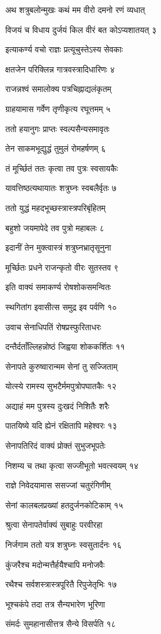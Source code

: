 अथ शत्रुबलोन्मुखः कथं मम वीरो दमनो रणं व्यधात्

विजयं च विधाय दुर्जयं किल वीरं बत कोऽप्यशातयत् ३

इत्याकर्ण्य वचो राज्ञः प्रत्यूचुस्तेऽस्य सेवकाः

क्षतजेन परिक्लिन्न गात्रवस्त्रादिधारिणः ४

राजन्नश्वं समालोक्य पत्रचिह्नाद्यलंकृतम्

ग्राहयामास गर्वेण तृणीकृत्य रघूत्तमम् ५

ततो हयानुगः प्राप्तः स्वल्पसैन्यसमावृतः

तेन साकमभूद्युद्धं तुमुलं रोमहर्षणम् ६

तं मूर्च्छितं ततः कृत्वा तव पुत्रः स्वसायकैः

यावत्तिष्ठत्यथायातः शत्रुघ्नः स्वबलैर्वृतः ७

ततो युद्धं महदभूच्छस्त्रास्त्रपरिबृंहितम्

बहुशो जयमापेदे तव पुत्रो महाबलः ८

इदानीं तेन मुक्त्वास्त्रं शत्रुघ्नभ्रातृसूनुना

मूर्च्छितः प्रधने राजन्कृतो वीरः सुतस्तव ९

इति वाक्यं समाकर्ण्य रोषशोकसमन्वितः

स्थगितांग इवासीत्स समुद्र इव पर्वणि १०

उवाच सेनाधिपतिं रोषप्रस्फुरिताधरः

दन्तैर्दताँल्लिहन्नोष्ठं जिह्वया शोककर्शितः ११

सेनापते कुरुष्वारान्मम सेनां तु सज्जिताम्

योत्स्ये रामस्य सुभटैर्ममपुत्रोपघातकैः १२

अद्याहं मम पुत्रस्य दुःखदं निशितैः शरैः

पातयिष्ये यदि ह्येनं रक्षितापि महेश्वरः १३

सेनापतिरिदं वाक्यं प्रोक्तं सुभुजभूपतेः

निशम्य च तथा कृत्वा सज्जीभूतो भवत्स्वयम् १४

राज्ञे निवेदयामास ससज्जां चतुरंगिणीम्

सेनां कालबलप्रख्यां हतदुर्जनकोटिकाम् १५

श्रुत्वा सेनापतेर्वाक्यं सुबाहुः परवीरहा

निर्जगाम ततो यत्र शत्रुघ्नः स्वसुतार्दनः १६

कुंजरैश्च मदोन्मत्तैर्हयैश्चापि मनोजवैः

रथैश्च सर्वशस्त्रास्त्रपूरितै रिपुजेतृभिः १७

भूश्चकंपे तदा तत्र सैन्यभारेण भूरिणा

संमर्दः सुमहानासीत्तत्र सैन्ये विसर्पति १८

